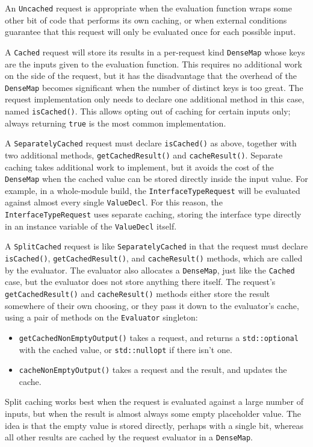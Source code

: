 \documentclass[../generics]{subfiles}
\begin{document}
An \texttt{Uncached} request is appropriate when the evaluation function wraps some other bit of code that performs its own caching, or when external conditions guarantee that this request will only be evaluated once for each possible input.

A \texttt{Cached} request will store its results in a per-request kind \texttt{DenseMap} whose keys are the inputs given to the evaluation function. This requires no additional work on the side of the request, but it has the disadvantage that the overhead of the \texttt{DenseMap} becomes significant when the number of distinct keys is too great. The request implementation only needs to declare one additional method in this case, named \texttt{isCached()}. This allows opting out of caching for certain inputs only; always returning \texttt{true} is the most common implementation.

A \texttt{SeparatelyCached} request must declare \texttt{isCached()} as above, together with two additional methods, \texttt{getCachedResult()} and \texttt{cacheResult()}. Separate caching takes additional work to implement, but it avoids the cost of the \texttt{DenseMap} when the cached value can be stored directly inside the input value. For example, in a whole-module build, the \texttt{InterfaceTypeRequest} will be evaluated against almost every single \texttt{ValueDecl}. For this reason, the \texttt{InterfaceTypeRequest} uses separate caching, storing the interface type directly in an instance variable of the \texttt{ValueDecl} itself.

A \texttt{SplitCached} request is like \texttt{SeparatelyCached} in that the request must declare \texttt{isCached()}, \texttt{getCachedResult()}, and \texttt{cacheResult()} methods, which are called by the evaluator. The evaluator also allocates a \texttt{DenseMap}, just like the \texttt{Cached} case, but the evaluator does not store anything there itself. The request's \texttt{getCachedResult()} and \texttt{cacheResult()} methods either store the result somewhere of their own choosing, or they pass it down to the evaluator's cache, using a pair of methods on the \texttt{Evaluator} singleton:
\begin{itemize}
\item \texttt{getCachedNonEmptyOutput()} takes a request, and returns a \texttt{std::optional} with the cached value, or \texttt{std::nullopt} if there isn't one.
\item \texttt{cacheNonEmptyOutput()} takes a request and the result, and updates the cache.
\end{itemize}
Split caching works best when the request is evaluated against a large number of inputs, but when the result is almost always some empty placeholder value. The idea is that the empty value is stored directly, perhaps with a single bit, whereas all other results are cached by the request evaluator in a \texttt{DenseMap}.
\end{document}

